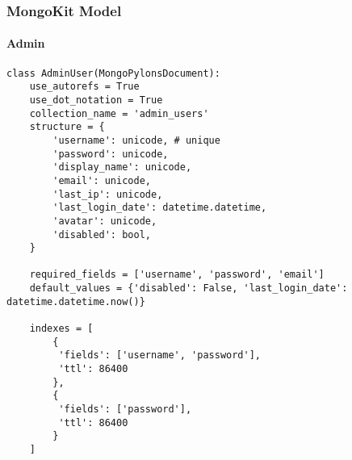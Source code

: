 \documentclass{beamer}
\begin{document}
% 
% 
% 
% 
\begin{frame}[fragile]
\frametitle{MongoKit Model}
\framesubtitle{Admin}
\begin{lstlisting}
class AdminUser(MongoPylonsDocument):
    use_autorefs = True
    use_dot_notation = True
    collection_name = 'admin_users'
    structure = {
        'username': unicode, # unique
        'password': unicode,
        'display_name': unicode,
        'email': unicode,
        'last_ip': unicode,
        'last_login_date': datetime.datetime,
        'avatar': unicode,
        'disabled': bool,
    }

    required_fields = ['username', 'password', 'email']
    default_values = {'disabled': False, 'last_login_date': datetime.datetime.now()}

    indexes = [
	    {
	     'fields': ['username', 'password'],
	     'ttl': 86400
	    },
        {
         'fields': ['password'],
         'ttl': 86400
        }
    ]
\end{lstlisting}
\end{frame}
\end{document}
